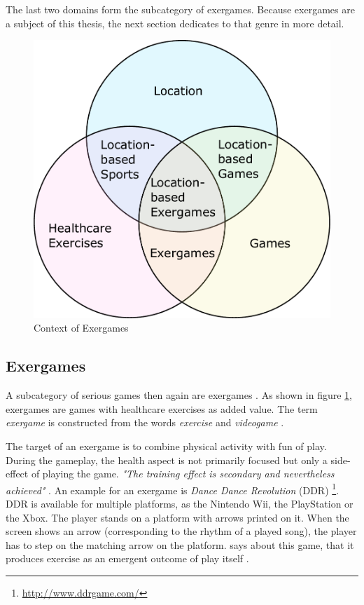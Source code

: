The last two domains form the subcategory of exergames. Because exergames are a subject of this thesis, the next section dedicates to that genre in more detail.

\begin{figure}[bth]
  \centering
        \includegraphics[width=.55\linewidth]{gfx/exergame_context}
        \caption{Context of Exergames}
        \label{fig:exergameContext}
\end{figure}

\subsection{Exergames}
A subcategory of serious games then again are exergames \citep{gobel2010serious} \citep{knoll2014urban}. As shown in figure \ref{fig:exergameContext}, exergames are games with healthcare exercises as added value. The term \emph{exergame} is constructed from the words \emph{exercise} and \emph{videogame} \citep{bogost2007persuasive}.

The target of an exergame is to combine physical activity with fun of play. During the gameplay, the health aspect is not primarily focused but only a side-effect of playing the game. \emph{"The training effect is secondary and nevertheless achieved"} \citep{knoll2014urban}. An example for an exergame is \emph{Dance Dance Revolution} (DDR) \footnote{\url{http://www.ddrgame.com/}}. DDR is available for multiple platforms, as the Nintendo Wii, the PlayStation or the Xbox. The player stands on a platform with arrows printed on it. When the screen shows an arrow (corresponding to the rhythm of a played song), the player has to step on the matching arrow on the platform. \citeauthor{bogost2007persuasive} says about this game, that it produces exercise as an emergent outcome of play itself \citep{bogost2007persuasive}.

